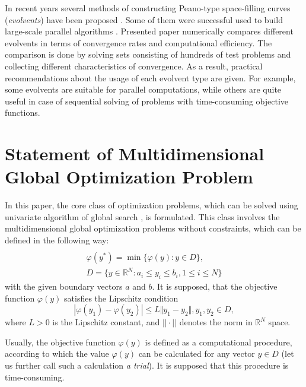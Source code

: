 \documentclass[3p,times,procedia]{elsarticle}
\begin{document}
In recent years several methods of constructing Peano-type space-filling curves (\textit{evolvents})
have been proposed \cite{strongin1978,Strongin1992,Goryachih2017,Gergel2009}. Some of them were
successful used to build large-scale parallel algorithms \cite{stronginGergelBarkalovParGO}.
Presented paper numerically compares different evolvents in terms of convergence rates and
computational efficiency. The comparison is done by solving sets consisting of hundreds of test problems and collecting
different characteristics of convergence. As a result, practical recommendations about
the usage of each evolvent type are given. For example, some evolvents are suitable for parallel computations,
while others are quite useful in case of sequential solving of problems with time-consuming objective functions.

\section{Statement of Multidimensional Global Optimization Problem}
In this paper, the core class of optimization problems, which can be solved using
univariate algorithm of global search \cite{strongin1978}, is formulated. This class involves the multidimensional global
optimization problems without constraints, which can be defined in the following way:
\begin{equation}
\label{eq:task}
\begin{array}{cr}\\
  \varphi(y^*)=\min\{\varphi(y):y\in D\}, \\
  D=\{y\in \mathbb{R}^N:a_i\leq y_i\leq{b_i}, 1\leq{i}\leq{N}\}
\end{array}
\end{equation}
with the given boundary vectors  $a$ and  $b$. It is supposed, that the objective function
\(\varphi(y)\) satisfies the Lipschitz condition
\begin{equation}
\label{eq:lip}
|\varphi(y_1)-\varphi(y_2)|\leq L\Vert y_1-y_2\Vert,y_1,y_2\in D,
\end{equation}
where \(L>0\) is the Lipschitz constant, and \(||\cdot||\) denotes the norm in \(\mathbb{R}^N\)
space.
\par
Usually, the objective function \(\varphi(y)\) is defined as a computational procedure,
according to which the value \(\varphi(y)\) can be calculated for any vector \(y\in D\)
(let us further call such a calculation \textit{a trial}). It is supposed that this procedure
is time-consuming.
\end{document}
